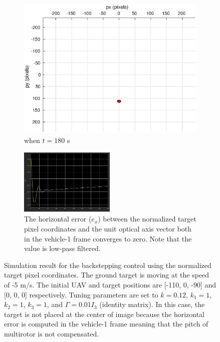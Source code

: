 \begin{figure}[htbp]
\begin{subfigure}[t]{0.32\linewidth}
		\includegraphics[width=\textwidth]{images/chapter4/image_camera_-5mps_180s}
		\caption{when $t=180$ s}
	\end{subfigure}	
	\begin{subfigure}[t]{0.8\linewidth}
		\centering
		\includegraphics[width=0.5\textwidth]{images/chapter4/image_Ex_-5mps}
		\caption{The horizontal error ($e_x$) between the normalized target pixel coordinates and the unit optical axis vector both in the vehicle-1 frame converges to zero. Note that the value is low-pass filtered.}
	\end{subfigure}	
	\caption[Simulation result for the backstepping control using the normalized target pixel coordinates.]{Simulation result for the backstepping control using the normalized target pixel coordinates. The ground target is moving at the speed of -5 m/s. The initial UAV and target positions are [-110, 0, -90] and [0, 0, 0] respectively. Tuning parameters are set to $k=0.12$, $k_1=1$, $k_2=1$, $k_3=1$, and $\Gamma=0.01I_3$ (identity matrix). In this case, the target is not placed at the center of image because the horizontal error is computed in the vehicle-1 frame meaning that the pitch of multirotor is not compensated.}
	\label{image_-5mps}
\end{figure}